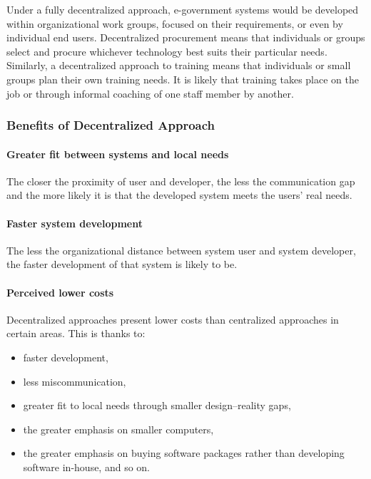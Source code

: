 Under a fully decentralized approach,
e-government systems would be developed
within organizational work groups, focused
on their requirements, or even by individual
end users. Decentralized procurement means
that individuals or groups select and procure whichever technology best suits their
particular needs. Similarly, a decentralized
approach to training means that individuals
or small groups plan their own training
needs. It is likely that training takes place
on the job or through informal coaching of
one staff member by another.

\subsubsection{Benefits of Decentralized Approach}

\paragraph*{Greater fit between systems and local needs}

The closer the proximity of user and developer, the less the communication gap and
the more likely it is that the developed
system meets the users’ real needs.


\paragraph*{Faster system development}
The less the organizational distance between
system user and system developer, the faster
development of that system is likely to be.


\paragraph*{Perceived lower costs}
Decentralized approaches present lower costs than centralized approaches in certain areas. This is thanks to:
\begin{itemize}
	\item faster development, 
	\item less miscommunication, 
	\item greater fit to local needs through smaller design–reality gaps, 
	\item the greater emphasis on smaller computers, 
	\item the greater emphasis on buying software packages rather than developing software in-house, and so on.
\end{itemize}


